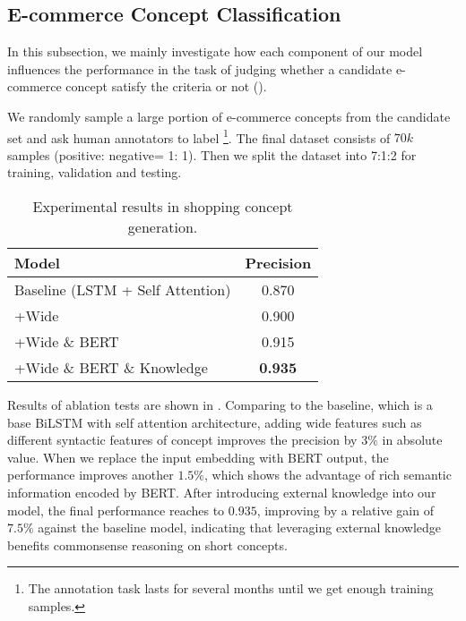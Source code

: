 
\subsection{E-commerce Concept Classification}

In this subsection,
we mainly investigate how each component of our model influences the performance in the task of judging whether a candidate e-commerce concept satisfy the criteria or not ().

We randomly sample a large portion of e-commerce concepts from the candidate set and ask human annotators to label \footnote{The annotation task lasts for several months until we get enough training samples.}. The final dataset consists of $70k$ samples (positive: negative= 1: 1). Then we split the dataset into 7:1:2 for training, validation and testing. 

\begin{table}[th]
	\centering
	\begin{tabular}{l|c}
		\hline
		Model & Precision   \\
		\hline
		Baseline (LSTM + Self Attention) & 0.870 \\
		+Wide  & 0.900 \\
		+Wide \& BERT & 0.915 \\
		+Wide \& BERT \& Knowledge & \textbf{0.935} \\
		\hline 
	\end{tabular}
	\caption{Experimental results in shopping concept generation. }
	\label{tab:concept}
\end{table}

Results of ablation tests are shown in .
Comparing to the baseline, which is a base BiLSTM with self attention architecture, adding wide features such as different syntactic features of concept improves the precision by $3\%$ in absolute value.
When we replace the input embedding with BERT output,
the performance improves another $1.5\%$, 
which shows the advantage of rich semantic information
encoded by BERT.
After introducing external knowledge into our model,
the final performance reaches to $0.935$, improving by a relative gain of $7.5\%$ against the baseline model, indicating that leveraging external knowledge benefits commonsense reasoning on short concepts.


